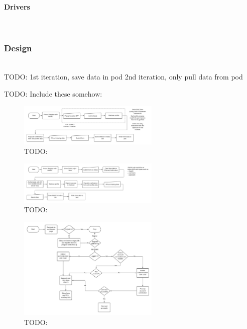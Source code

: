 \paragraph{Drivers}\mbox{}\\

\subsubsection{Design}\mbox{}\\

TODO:
1st iteration, save data in pod
2nd iteration, only pull data from pod

TODO: Include these somehow:

\begin{figure}
    \centering
    \includegraphics[width=0.6\textwidth]{prototype/graphs/poc-conference_registration_flow-client_side-sideways.jpeg}
    \caption{TODO:}
    \label{fig:poc-conference_registration_flow-client_side-sideways}
\end{figure}

\begin{figure}
    \centering
    \includegraphics[width=0.6\textwidth]{prototype/graphs/poc-conference_registration_flow-server_side-sideways.jpeg}
    \caption{TODO:}
    \label{fig:poc-conference_registration_flow-server_side-sideways}
\end{figure}

\begin{figure}
    \centering
    \includegraphics[width=0.6\textwidth]{prototype/graphs/poc-conference_registration_flow-sideways.jpeg}
    \caption{TODO:}
    \label{fig:poc-conference_registration_flow-sideways}
\end{figure}

